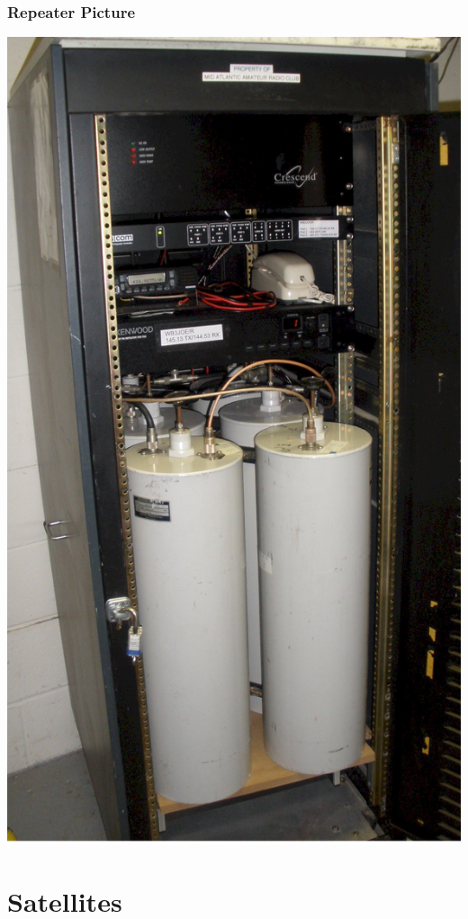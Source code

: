 \documentclass[10pt]{beamer}
\begin{document}
\begin{frame}
\frametitle{Repeater Picture}
\begin{center}
\includegraphics[height=.95\textheight]{repeater.jpg}
\end{center}
\end{frame}

\section{Satellites}
\end{document}
